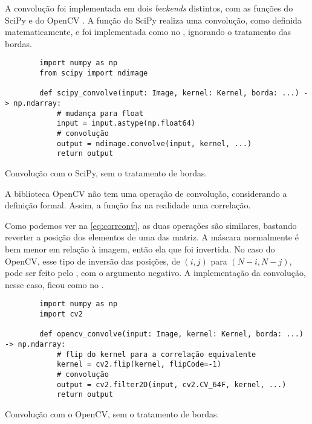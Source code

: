A convolução foi implementada em dois \textit{beckends} distintos, com as funções  do SciPy \autocite{ref:ndimage} e  do OpenCV \autocite{ref:cvfilter}. A função do SciPy realiza uma convolução, como definida matematicamente, e foi implementada como no , ignorando o tratamento das bordas.

\begin{listing}[H]
    \begin{verbatim}
        import numpy as np
        from scipy import ndimage

        def scipy_convolve(input: Image, kernel: Kernel, borda: ...) -> np.ndarray:
            # mudança para float
            input = input.astype(np.float64)
            # convolução
            output = ndimage.convolve(input, kernel, ...)
            return output
    \end{verbatim}

    \caption{Convolução com o SciPy, sem o tratamento de bordas.}
    \label{code:scipy}
\end{listing}

A biblioteca OpenCV não tem uma operação de convolução, considerando a definição formal. Assim, a função  faz na realidade uma correlação.

Como podemos ver na \cref{eq:corrconv}, as duas operações são similares, bastando reverter a posição dos elementos de uma das matriz. A máscara normalmente é bem menor em relação à imagem, então ela que foi invertida. No caso do OpenCV, esse tipo de inversão das posições, de $(i, j)$ para $(N-i, N-j)$, pode ser feito pelo  \autocite{ref:cvflip}, com o argumento  negativo. A implementação da convolução, nesse caso, ficou como no .

\begin{listing}[H]
    \begin{verbatim}
        import numpy as np
        import cv2

        def opencv_convolve(input: Image, kernel: Kernel, borda: ...) -> np.ndarray:
            # flip do kernel para a correlação equivalente
            kernel = cv2.flip(kernel, flipCode=-1)
            # convolução
            output = cv2.filter2D(input, cv2.CV_64F, kernel, ...)
            return output
    \end{verbatim}

    \caption{Convolução com o OpenCV, sem o tratamento de bordas.}
    \label{code:opencv}
\end{listing}

